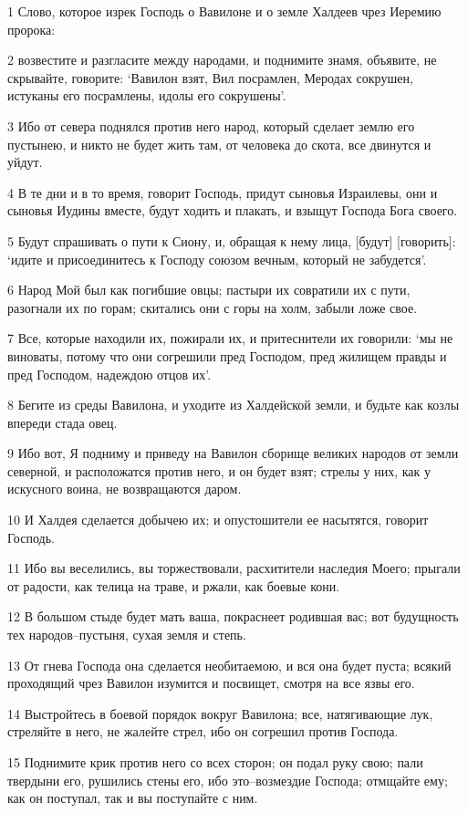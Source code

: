 \par 1 Слово, которое изрек Господь о Вавилоне и о земле Халдеев чрез Иеремию пророка:
\par 2 возвестите и разгласите между народами, и поднимите знамя, объявите, не скрывайте, говорите: `Вавилон взят, Вил посрамлен, Меродах сокрушен, истуканы его посрамлены, идолы его сокрушены'.
\par 3 Ибо от севера поднялся против него народ, который сделает землю его пустынею, и никто не будет жить там, от человека до скота, все двинутся и уйдут.
\par 4 В те дни и в то время, говорит Господь, придут сыновья Израилевы, они и сыновья Иудины вместе, будут ходить и плакать, и взыщут Господа Бога своего.
\par 5 Будут спрашивать о пути к Сиону, и, обращая к нему лица, [будут] [говорить]: `идите и присоединитесь к Господу союзом вечным, который не забудется'.
\par 6 Народ Мой был как погибшие овцы; пастыри их совратили их с пути, разогнали их по горам; скитались они с горы на холм, забыли ложе свое.
\par 7 Все, которые находили их, пожирали их, и притеснители их говорили: `мы не виноваты, потому что они согрешили пред Господом, пред жилищем правды и пред Господом, надеждою отцов их'.
\par 8 Бегите из среды Вавилона, и уходите из Халдейской земли, и будьте как козлы впереди стада овец.
\par 9 Ибо вот, Я подниму и приведу на Вавилон сборище великих народов от земли северной, и расположатся против него, и он будет взят; стрелы у них, как у искусного воина, не возвращаются даром.
\par 10 И Халдея сделается добычею их; и опустошители ее насытятся, говорит Господь.
\par 11 Ибо вы веселились, вы торжествовали, расхитители наследия Моего; прыгали от радости, как телица на траве, и ржали, как боевые кони.
\par 12 В большом стыде будет мать ваша, покраснеет родившая вас; вот будущность тех народов--пустыня, сухая земля и степь.
\par 13 От гнева Господа она сделается необитаемою, и вся она будет пуста; всякий проходящий чрез Вавилон изумится и посвищет, смотря на все язвы его.
\par 14 Выстройтесь в боевой порядок вокруг Вавилона; все, натягивающие лук, стреляйте в него, не жалейте стрел, ибо он согрешил против Господа.
\par 15 Поднимите крик против него со всех сторон; он подал руку свою; пали твердыни его, рушились стены его, ибо это--возмездие Господа; отмщайте ему; как он поступал, так и вы поступайте с ним.
